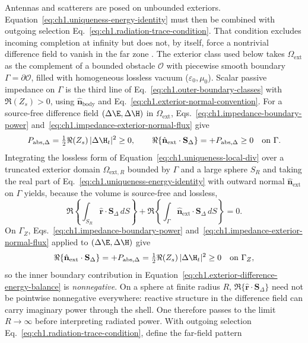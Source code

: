 Antennas and scatterers are posed on unbounded exteriors. Equation~\eqref{eq:ch1.uniqueness-energy-identity} must then be combined with outgoing selection Eq.~\eqref{eq:ch1.radiation-trace-condition}. That condition excludes incoming completion at infinity but does not, by itself, force a nontrivial difference field to vanish in the far zone \cite{sommerfeld1949,harrington2001}. The exterior class used below takes $\Omega_{\mathrm{ext}}$ as the complement of a bounded obstacle $\mathcal{O}$ with piecewise smooth boundary $\Gamma=\partial\mathcal{O}$, filled with homogeneous lossless vacuum ($\varepsilon_0,\mu_0$). Scalar passive impedance on $\Gamma$ is the third line of Eq.~\eqref{eq:ch1.outer-boundary-classes} with $\Re(Z_s)>0$, using $\hat{\mathbf{n}}_{\mathrm{body}}$ and Eq.~\eqref{eq:ch1.exterior-normal-convention}. For a source-free difference field $(\Delta\E,\Delta\H)$ in $\Omega_{\mathrm{ext}}$, Eqs.~\eqref{eq:ch1.impedance-boundary-power} and~\eqref{eq:ch1.impedance-exterior-normal-flux} give
\[
P_{\mathrm{abs},\Delta}
=\tfrac12\Re(Z_s)\,|\Delta\H_t|^{2}\ge 0,
\qquad
\Re\!\left\{\hat{\mathbf{n}}_{\mathrm{ext}}\cdot\mathbf{S}_\Delta\right\}
=+P_{\mathrm{abs},\Delta}\ge 0
\quad\text{on }\Gamma.
\]
Integrating the lossless form of Equation~\eqref{eq:ch1.uniqueness-local-div} over a truncated exterior domain $\Omega_{\mathrm{ext},R}$ bounded by $\Gamma$ and a large sphere $S_R$ and taking the real part of Eq.~\eqref{eq:ch1.uniqueness-energy-identity} with outward normal $\hat{\mathbf{n}}_{\mathrm{ext}}$ on $\Gamma$ yields, because the volume is source-free and lossless,
\begin{equation}
\label{eq:ch1.exterior-difference-energy-balance}
\Re\!\left\{\int_{S_R}\hat{\mathbf{r}}\cdot\mathbf{S}_\Delta\,dS\right\}
+\Re\!\left\{\int_{\Gamma}\hat{\mathbf{n}}_{\mathrm{ext}}\cdot\mathbf{S}_\Delta\,dS\right\}=0.
\end{equation}
On $\Gamma_Z$, Eqs.~\eqref{eq:ch1.impedance-boundary-power} and~\eqref{eq:ch1.impedance-exterior-normal-flux} applied to $(\Delta\E,\Delta\H)$ give
\[
\Re\!\left\{\hat{\mathbf{n}}_{\mathrm{ext}}\cdot\mathbf{S}_\Delta\right\}
=+P_{\mathrm{abs},\Delta}
=\tfrac12\Re(Z_s)\,|\Delta\H_t|^{2}\ge 0
\quad\text{on }\Gamma_Z,
\]
so the inner boundary contribution in Equation~\eqref{eq:ch1.exterior-difference-energy-balance} is \emph{nonnegative}. On a sphere at finite radius $R$, $\Re\{\hat{\mathbf{r}}\cdot\mathbf{S}_\Delta\}$ need not be pointwise nonnegative everywhere: reactive structure in the difference field can carry imaginary power through the shell. One therefore passes to the limit $R\to\infty$ before interpreting radiated power. With outgoing selection Eq.~\eqref{eq:ch1.radiation-trace-condition}, define the far-field pattern
